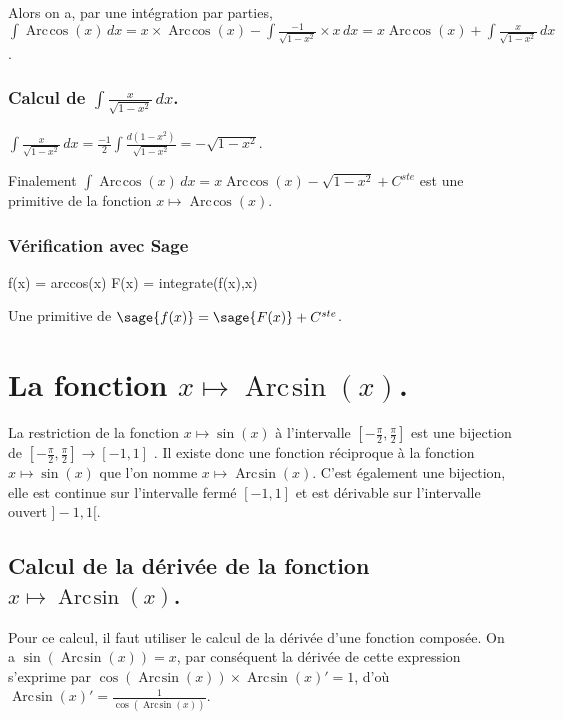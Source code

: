 \documentclass[a4paper,12pt]{report}
\renewcommand{\arcsin}{\mathop{\mathrm{Arc\mspace{2mu}sin}}}
\renewcommand{\arccos}{\mathop{\mathrm{Arc\mspace{2mu}cos}}}
\begin{document}
Alors on a, par une intégration par parties, $\int \arccos(x) \, dx = x \times \arccos(x) -\int \frac{-1}{\sqrt{1- x^2}} \times x \, dx =  x \arccos(x) + \int \frac{x}{\sqrt{1- x^2}} \, dx $.


\subsubsection*{Calcul de $\int \frac{x}{\sqrt{1- x^2}} \, dx $.}

$\int \frac{x}{\sqrt{1- x^2}} \, dx = \frac{-1}{2} \int \frac{d(1-x^2)}{\sqrt{1- x^2}}= -\sqrt{1- x^2} $.


Finalement $\int \arccos(x) \, dx = x  \arccos(x) - \sqrt{1- x^2} + C^{ste} $ est une primitive de la fonction $x \mapsto \arccos(x) $.

\subsubsection*{Vérification avec Sage}

\begin{sageblock}
    f(x) = arccos(x)
    F(x) = integrate(f(x),x)
\end{sageblock}

Une primitive de $\sage{f(x)} = \sage{F(x)} + C^{ste}$.


\section{La fonction  $x \mapsto \arcsin(x) $.}

La restriction de la fonction $x \mapsto \sin(x) $ à l'intervalle $\left[-\frac{\pi}{2},\frac{\pi}{2}\right]$ est une bijection de $\left[-\frac{\pi}{2},\frac{\pi}{2}\right] \rightarrow [-1,1]$ . Il existe donc une fonction réciproque à la fonction $x \mapsto \sin(x) $ que l'on nomme $x \mapsto \arcsin(x) $. C'est également une bijection, elle est continue sur l'intervalle fermé  $ [-1,1]$ et est dérivable sur l'intervalle ouvert $]-1,1[$.

\subsection{Calcul de la dérivée de la fonction $x \mapsto \arcsin(x) $.}


Pour ce calcul, il faut utiliser le calcul de la dérivée d'une fonction composée. On a $\sin(\arcsin(x))=x$, par conséquent la dérivée de cette expression s'exprime par $ \cos(\arcsin(x)) \times \arcsin(x) ' = 1$, d'où $\arcsin(x) ' = \frac{1}{\cos(\arcsin(x))} $.
\end{document}
